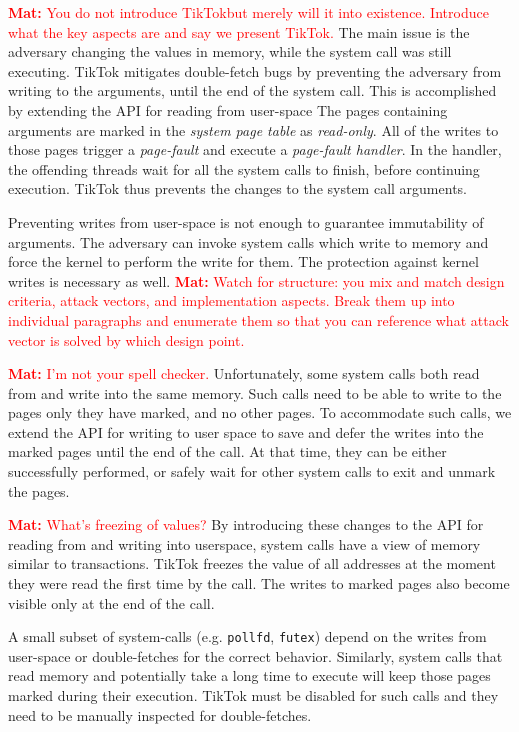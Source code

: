 \documentclass[conference]{IEEEtran}
\newcommand{\mat}[1]{\textcolor{red}{\textbf{Mat:} #1}}
\newcommand{\sysname}{TikTok}
\begin{document}
\mat{You do not introduce \sysname but merely will it into existence. Introduce
what the key aspects are and say we present \sysname.}
The main issue is the adversary changing the values in memory, while the system
call was still executing. \sysname{} mitigates double-fetch bugs by preventing the
adversary from writing to the arguments, until the end of the system call. This
is accomplished by extending the API for reading from user-space The pages
containing arguments are marked in the \emph{system page table} as
\emph{read-only}. All of the writes to those pages trigger a \emph{page-fault}
and execute a \emph{page-fault handler}. In the handler, the offending threads
wait for all the system calls to finish, before continuing execution. \sysname
thus prevents the changes to the system call arguments.

Preventing writes from user-space is not enough to guarantee immutability of arguments.
The adversary can invoke system calls which write to memory and force the kernel
to perform the write for them. The protection against kernel writes is necessary
as well.
\mat{Watch for structure: you mix and match design criteria, attack vectors, and
implementation aspects. Break them up into individual paragraphs and enumerate
them so that you can reference what attack vector is solved by which design
point.}

\mat{I'm not your spell checker.}
Unfortunately, some system calls both read from and write into the same memory.
Such calls need to be able to write to the pages only they have marked, and no
other pages. To accommodate such calls, we extend the API for writing to user
space to save and defer the writes into the marked pages until the end of the
call. At that time, they can be either successfully performed, or safely wait
for other system calls to exit and unmark the pages.

\mat{What's freezing of values?}
By introducing these changes to the API for reading from and writing into userspace,
system calls have a view of memory similar to transactions. \sysname{} freezes the
value of all addresses at the moment they were read the first time by the call. 
The writes to marked pages also become visible only at the end of the call. 

A small subset of system-calls (e.g. \texttt{pollfd}, \texttt{futex}) depend on
the writes from user-space or double-fetches for the correct behavior. Similarly,
system calls that read memory and potentially take a long time to execute will
keep those pages marked during their execution. \sysname{} must be disabled for
such calls and they need to be manually inspected for double-fetches.
\end{document}
